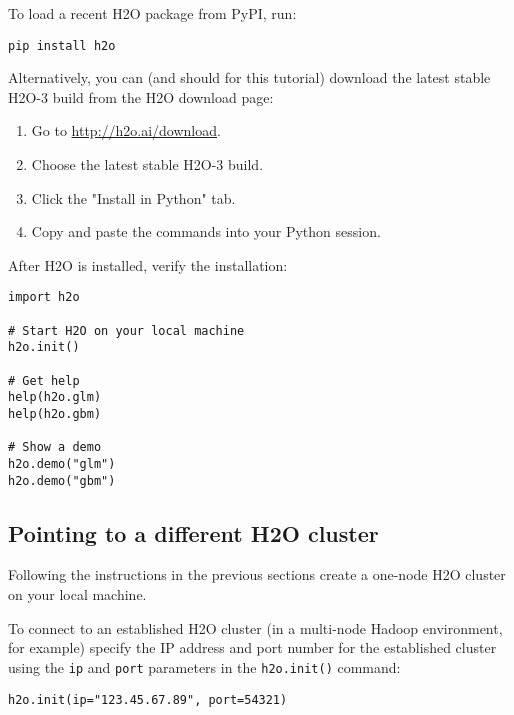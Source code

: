 To load a recent H2O package from PyPI, run:

\begin{lstlisting}[style=python]
pip install h2o
\end{lstlisting}

Alternatively, you can (and should for this tutorial) download the
latest stable H2O-3 build from the H2O download page:

\begin{enumerate}
\item Go to {\url{http://h2o.ai/download}}.
\item Choose the latest stable H2O-3 build.
\item Click the "Install in Python" tab.
\item Copy and paste the commands into your Python session.
\end{enumerate}

\bigskip
After H2O is installed, verify the installation:

\begin{lstlisting}[style=python]
import h2o

# Start H2O on your local machine
h2o.init()

# Get help
help(h2o.glm)
help(h2o.gbm)

# Show a demo
h2o.demo("glm")
h2o.demo("gbm")

\end{lstlisting}

\subsection{Pointing to a different H2O cluster}

Following the instructions in the previous sections create a one-node H2O cluster on your local machine. 

To connect to an established H2O cluster (in a multi-node Hadoop environment, for example) specify the IP address and port number for the established cluster using the \texttt{ip} and \texttt{port} parameters in the \texttt{h2o.init()} command: 

\begin{lstlisting}[style=R]
h2o.init(ip="123.45.67.89", port=54321)
\end{lstlisting}
